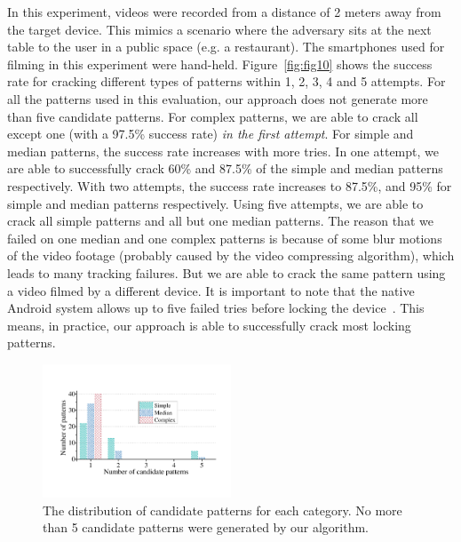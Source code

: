         In this experiment, videos were recorded from a distance of 2 meters away
        from the target device. This mimics a scenario where the adversary sits
        at the next table to the user in a public space (e.g. a restaurant).
        The smartphones used for filming in this experiment were hand-held.
        Figure~\ref{fig:fig10}
        shows the success rate for cracking different types of patterns within 1, 2, 3, 4 and 5 attempts.     For all the patterns used in this evaluation,
        our approach does not generate more than  five candidate patterns.
        For complex patterns, we are able to crack all except one (with a 97.5\% success rate) \emph{in the first attempt}.
        For simple and median patterns, the success rate increases with more tries.
        In one attempt, we are able to
        successfully crack 60\% and 87.5\% of the simple and median patterns respectively. With two attempts, the success rate increases to 87.5\%,
        and 95\% for simple and median patterns
        respectively. Using five attempts, we are able to
        crack all simple patterns and all but one median patterns.
       The reason that we failed on one median and one complex patterns is because of some blur motions of the video footage (probably
       caused by the video compressing algorithm), which leads
       to many tracking failures. But we are able to crack the same
       pattern using a video filmed by a different device.
        It is important to note that the native Android system allows up to five failed tries before locking the device~\cite{egelman2014you}. This means, in practice, our approach is able to
        successfully crack most locking patterns.

\begin{figure}[!t]
    \centering
    \includegraphics[width=0.5\textwidth]{fig/11.pdf}
    \caption{The distribution of candidate patterns for each category. No more than 5 candidate patterns were generated by our algorithm. }
    \label{fig:fig11}
\end{figure}



